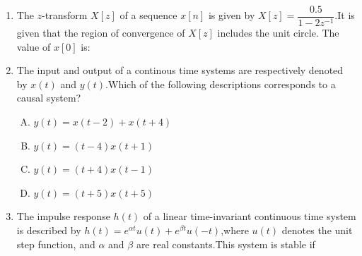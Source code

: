 \documentclass[journal,12pt,twocolumn]{IEEEtran}
\begin{document}
\begin{enumerate}
\begin{enumerate}[(A)]
\end{enumerate}

 
\item The $z$-transform $X[z]$ of a sequence $x[n]$ is given by $X[z]=\dfrac{0.5}{1-2z^{-1}}$.It is given that the region of convergence of $X[z]$ includes the unit circle. The value of $x[0]$ is:\\
\begin{enumerate}[(A)]
\end{enumerate}

\item The input and output of a continous time systems are respectively denoted by $x(t)$ and $y(t)$.Which of the following descriptions corresponds to a causal system?\\
\begin{enumerate}[(A)]

\setlength\itemsep{2em}

\item $y(t)=x(t-2)+x(t+4)$
\item $y(t)=(t-4)x(t+1)$
\item $y(t)=(t+4)x(t-1)$
\item $y(t)=(t+5)x(t+5)$


\end{enumerate}


\item The impulse response $h(t)$ of a linear time-invariant continuous time system is described by $h(t)=e^{\alpha t}u(t)+e^{\beta t}u(-t)$,where $u(t)$ denotes the unit step function, and $\alpha$ and $\beta$ are real constants.This system is stable if\\

\begin{enumerate}[(A)]

\setlength\itemsep{2em}


\end{enumerate}
\end{enumerate}
\end{document}
